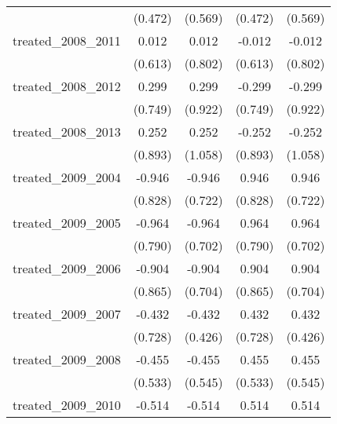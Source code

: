 {\begin{tabular}{l*{4}{c}}
            &     (0.472)         &     (0.569)         &     (0.472)         &     (0.569)         \\
[1em]
treated\_2008\_2011&       0.012         &       0.012         &      -0.012         &      -0.012         \\
            &     (0.613)         &     (0.802)         &     (0.613)         &     (0.802)         \\
[1em]
treated\_2008\_2012&       0.299         &       0.299         &      -0.299         &      -0.299         \\
            &     (0.749)         &     (0.922)         &     (0.749)         &     (0.922)         \\
[1em]
treated\_2008\_2013&       0.252         &       0.252         &      -0.252         &      -0.252         \\
            &     (0.893)         &     (1.058)         &     (0.893)         &     (1.058)         \\
[1em]
treated\_2009\_2004&      -0.946         &      -0.946         &       0.946         &       0.946         \\
            &     (0.828)         &     (0.722)         &     (0.828)         &     (0.722)         \\
[1em]
treated\_2009\_2005&      -0.964         &      -0.964         &       0.964         &       0.964         \\
            &     (0.790)         &     (0.702)         &     (0.790)         &     (0.702)         \\
[1em]
treated\_2009\_2006&      -0.904         &      -0.904         &       0.904         &       0.904         \\
            &     (0.865)         &     (0.704)         &     (0.865)         &     (0.704)         \\
[1em]
treated\_2009\_2007&      -0.432         &      -0.432         &       0.432         &       0.432         \\
            &     (0.728)         &     (0.426)         &     (0.728)         &     (0.426)         \\
[1em]
treated\_2009\_2008&      -0.455         &      -0.455         &       0.455         &       0.455         \\
            &     (0.533)         &     (0.545)         &     (0.533)         &     (0.545)         \\
[1em]
treated\_2009\_2010&      -0.514         &      -0.514         &       0.514         &       0.514         \\

\end{tabular}}
